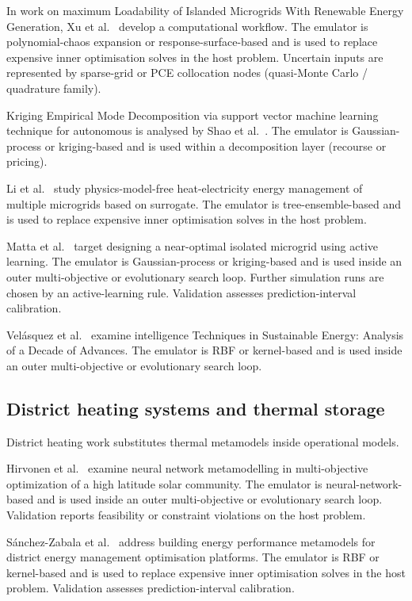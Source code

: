 In work on maximum Loadability of Islanded Microgrids With Renewable Energy Generation, Xu et al.~\cite{Xu20184696} develop a computational workflow. The emulator is polynomial-chaos expansion or response-surface-based and is used to replace expensive inner optimisation solves in the host problem. Uncertain inputs are represented by sparse-grid or PCE collocation nodes (quasi-Monte Carlo / quadrature family).

Kriging Empirical Mode Decomposition via support vector machine learning technique for autonomous is analysed by Shao et al.~\cite{Shao201858}. The emulator is Gaussian-process or kriging-based and is used within a decomposition layer (recourse or pricing).

Li et al.~\cite{Li2023__3} study physics-model-free heat-electricity energy management of multiple microgrids based on surrogate. The emulator is tree-ensemble-based and is used to replace expensive inner optimisation solves in the host problem.

Matta et al.~\cite{Matta2026} target designing a near-optimal isolated microgrid using active learning. The emulator is Gaussian-process or kriging-based and is used inside an outer multi-objective or evolutionary search loop. Further simulation runs are chosen by an active-learning rule. Validation assesses prediction-interval calibration.

Velásquez et al.~\cite{velasquez_intelligence_2023} examine intelligence Techniques in Sustainable Energy: Analysis of a Decade of Advances. The emulator is RBF or kernel-based and is used inside an outer multi-objective or evolutionary search loop.

\subsection{District heating systems and thermal storage}
\label{sec:apps:dh}

District heating work substitutes thermal metamodels inside operational models.

Hirvonen et al.~\cite{Hirvonen2017323} examine neural network metamodelling in multi-objective optimization of a high latitude solar community. The emulator is neural-network-based and is used inside an outer multi-objective or evolutionary search loop. Validation reports feasibility or constraint violations on the host problem.

Sánchez-Zabala et al.~\cite{Sánchez-Zabala2024} address building energy performance metamodels for district energy management optimisation platforms. The emulator is RBF or kernel-based and is used to replace expensive inner optimisation solves in the host problem. Validation assesses prediction-interval calibration.

